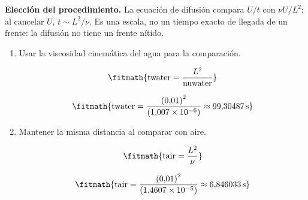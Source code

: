 \noindent\textbf{Elección del procedimiento.} La ecuación de difusión compara $U/t$ con $\nu U/L^2$; al cancelar $U$, $t\sim L^2/\nu$. Es una escala, no un tiempo exacto de llegada de un frente: la difusión no tiene un frente nítido.

\begin{enumerate}

\item Usar la viscosidad cinemática del agua para la comparación.

\[\fitmath{\mathrm{twater}=\frac{{L}^{2}}{\mathrm{nuwater}}}\]

\[\fitmath{\mathrm{twater}=\frac{{(0{,}01)}^{2}}{(1{,}007\times10^{-6})}\approx 99{,}30487\,\mathrm{s}}\]

\item Mantener la misma distancia al comparar con aire.

\[\fitmath{\mathrm{tair}=\frac{{L}^{2}}{\nu}}\]

\[\fitmath{\mathrm{tair}=\frac{{(0{,}01)}^{2}}{(1{,}4607\times10^{-5})}\approx 6{,}846033\,\mathrm{s}}\]

\end{enumerate}
